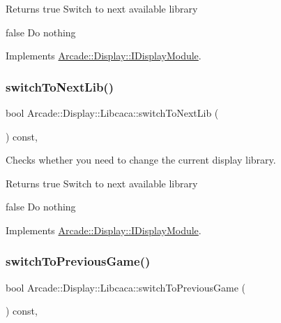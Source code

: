 \begin{DoxyReturn}{Returns}
true Switch to next available library 

false Do nothing 
\end{DoxyReturn}


Implements \mbox{\hyperlink{classArcade_1_1Display_1_1IDisplayModule_a9584cb0ca3b157c9a4ec94509e4f8e32}{Arcade\+::\+Display\+::\+I\+Display\+Module}}.

\mbox{\label{classArcade_1_1Display_1_1Libcaca_ada47921d3d90780e6817bddd1efcd017}} 
\subsubsection{\texorpdfstring{switchToNextLib()}{switchToNextLib()}}
{\footnotesize\ttfamily bool Arcade\+::\+Display\+::\+Libcaca\+::switch\+To\+Next\+Lib (\begin{DoxyParamCaption}{ }\end{DoxyParamCaption}) const\hspace{0.3cm}{\ttfamily [final]}, {\ttfamily [virtual]}}



Checks whether you need to change the current display library. 

\begin{DoxyReturn}{Returns}
true Switch to next available library 

false Do nothing 
\end{DoxyReturn}


Implements \mbox{\hyperlink{classArcade_1_1Display_1_1IDisplayModule_a0de47361c9d47bf8fc52070b945f23b7}{Arcade\+::\+Display\+::\+I\+Display\+Module}}.

\mbox{\label{classArcade_1_1Display_1_1Libcaca_a2bb528b251b6845c1f429f9f7dc58f4f}} 
\subsubsection{\texorpdfstring{switchToPreviousGame()}{switchToPreviousGame()}}
{\footnotesize\ttfamily bool Arcade\+::\+Display\+::\+Libcaca\+::switch\+To\+Previous\+Game (\begin{DoxyParamCaption}{ }\end{DoxyParamCaption}) const\hspace{0.3cm}{\ttfamily [final]}, {\ttfamily [virtual]}}



